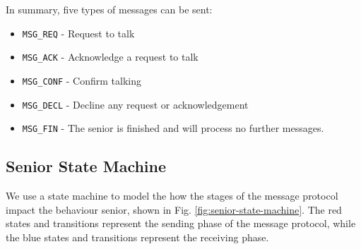 \documentclass[12pt,a4paper]{scrartcl}
\begin{document}
In summary, five types of messages can be sent:
\begin{itemize}
    \item \texttt{MSG\_REQ} - Request to talk
    \item \texttt{MSG\_ACK} - Acknowledge a request to talk
    \item \texttt{MSG\_CONF} - Confirm talking
    \item \texttt{MSG\_DECL} - Decline any request or acknowledgement
    \item \texttt{MSG\_FIN} - The senior is finished and will process no further messages.
\end{itemize}

\subsection{Senior State Machine}
We use a state machine to model the how the stages of the message protocol impact the behaviour senior, shown in Fig. \ref{fig:senior-state-machine}.
The red states and transitions represent the sending phase of the message protocol, while the blue states and transitions represent the receiving phase.
\end{document}
